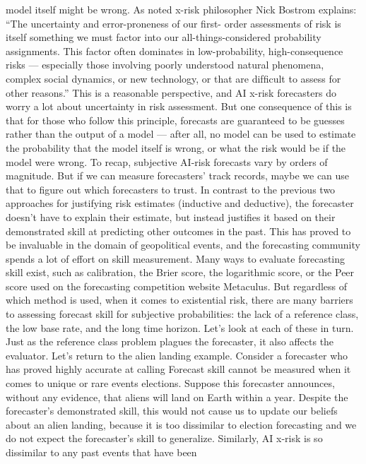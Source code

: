 model itself might be wrong. As noted x-risk philosopher Nick
Bostrom explains: “The uncertainty and error-proneness of our ﬁrst-
order assessments of risk is itself something we must factor into our
all-things-considered probability assignments. This factor often
dominates in low-probability, high-consequence risks — especially
those involving poorly understood natural phenomena, complex
social dynamics, or new technology, or that are difﬁcult to assess for
other reasons.”
This is a reasonable perspective, and AI x-risk forecasters do worry a
lot about uncertainty in risk assessment. But one consequence of
this is that for those who follow this principle, forecasts are
guaranteed to be guesses rather than the output of a model — after
all, no model can be used to estimate the probability that the model
itself is wrong, or what the risk would be if the model were wrong.
To recap, subjective AI-risk forecasts vary by orders of magnitude.
But if we can measure forecasters’ track records, maybe we can use
that to ﬁgure out which forecasters to trust. In contrast to the
previous two approaches for justifying risk estimates (inductive and
deductive), the forecaster doesn’t have to explain their estimate, but
instead justiﬁes it based on their demonstrated skill at predicting
other outcomes in the past.
This has proved to be invaluable in the domain of geopolitical events,
and the forecasting community spends a lot of effort on skill
measurement. Many ways to evaluate forecasting skill exist, such as
calibration, the Brier score, the logarithmic score, or the Peer score
used on the forecasting competition website Metaculus.
But regardless of which method is used, when it comes to existential
risk, there are many barriers to assessing forecast skill for subjective
probabilities: the lack of a reference class, the low base rate, and the
long time horizon. Let’s look at each of these in turn.
Just as the reference class problem plagues the forecaster, it also
affects the evaluator. Let’s return to the alien landing example.
Consider a forecaster who has proved highly accurate at calling
Forecast skill cannot be measured when it
comes to unique or rare events
elections. Suppose this forecaster announces, without any evidence,
that aliens will land on Earth within a year. Despite the forecaster’s
demonstrated skill, this would not cause us to update our beliefs
about an alien landing, because it is too dissimilar to election
forecasting and we do not expect the forecaster’s skill to generalize.
Similarly, AI x-risk is so dissimilar to any past events that have been

